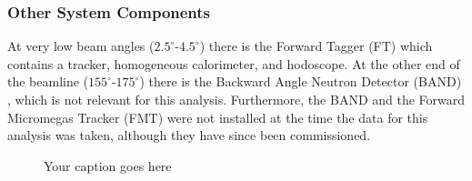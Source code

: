         

\subsubsection*{Other System Components}

    At very low beam angles ($2.5^{\circ}$-$4.5^{\circ}$) there is the Forward Tagger (FT) \parencite{Acker2020TheTagger} which contains a tracker, homogeneous calorimeter, and hodoscope. At the other end of the beamline ($155^{\circ}$-$175^{\circ}$) there is the Backward Angle Neutron Detector (BAND)  \parencite{Segarra2020TheBAND}, which is not relevant for this analysis. Furthermore, the BAND and the Forward Micromegas Tracker (FMT)  \parencite{Acker2020TheTracker} were not installed at the time the data for this analysis was taken, although they have since been commissioned. 
    
    

\iffalse

    \begin{figure}[H]
        \centering
        \hfill
        \hfill
        \caption{Your caption goes here}
        \label{fig:others}
    \end{figure}

